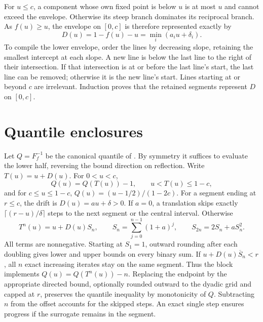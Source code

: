 \documentclass{article}
\begin{document}
For $u\leq c$, a component whose own fixed point is below $u$ is at
most $u$ and cannot exceed the envelope. Otherwise its steep branch
dominates its reciprocal branch. As $f(u)\geq u$, the envelope on
$[0,c]$ is therefore represented exactly by
\[
 D(u)=1-f(u)-u=\min_i(a_i u+\delta_i).
\]
To compile the lower envelope, order the lines by decreasing slope,
retaining the smallest intercept at each slope. A new line is below
the last line to the right of their intersection. If that intersection
is at or before the last line's start, the last line can be removed;
otherwise it is the new line's start. Lines starting at or beyond $c$
are irrelevant. Induction proves that the retained segments represent
$D$ on $[0,c]$.

\section{Quantile enclosures}


Let $Q=F_f^{-1}$ be the canonical quantile of
\cite[Proposition~F.6]{awan2023canonical}. By symmetry it suffices to
evaluate the lower half, reversing the bound direction on reflection.
Write $T(u)=u+D(u)$. For $0<u<c$,
\[
 Q(u)=Q(T(u))-1,\qquad u<T(u)\leq1-c,
\]
and for $c\leq u\leq1-c$,
$Q(u)=(u-1/2)/(1-2c)$.
For a segment ending at $r\leq c$, the drift is $D(u)=au+\delta>0$.
If $a=0$, a translation
skips exactly $\lceil(r-u)/\delta\rceil$ steps to the next segment
or the central interval. Otherwise
\[
 T^n(u)=u+D(u)S_n,\qquad S_n=\sum_{j=0}^{n-1}(1+a)^j,\qquad
 S_{2n}=2S_n+aS_n^2.
\]
All terms are nonnegative. Starting at $S_1=1$, outward rounding
after each doubling gives lower and upper bounds on every binary sum.
If $u+D(u)\overline S_n<r$, all $n$ exact increasing iterates stay
on the same segment. Thus the block implements $Q(u)=Q(T^n(u))-n$.
Replacing the endpoint by the appropriate directed bound, optionally
rounded outward to the dyadic grid and capped at $r$, preserves
the quantile inequality by monotonicity of $Q$. Subtracting $n$ from
the offset accounts for the skipped steps. An exact single step
ensures progress if the surrogate remains in the segment.
\end{document}
